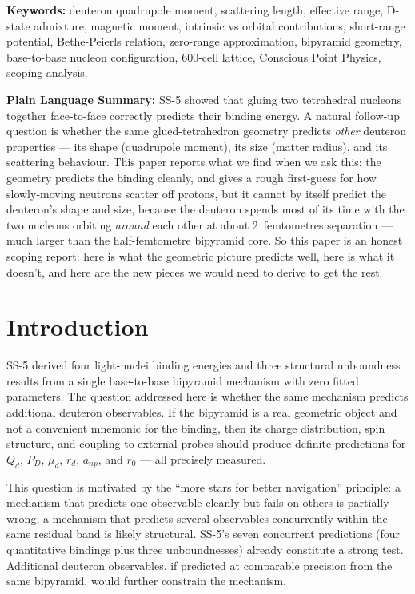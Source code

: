 \documentclass[11pt,letterpaper]{article}
\newcommand{\Qd}{Q_{d}}
\newcommand{\PD}{P_{D}}
\newcommand{\mud}{\mu_{d}}
\newcommand{\anp}{a_{np}}
\newcommand{\rzero}{r_{0}}
\begin{document}
\medskip\noindent
\textbf{Keywords:} deuteron quadrupole moment, scattering length, effective range, D-state admixture, magnetic moment, intrinsic vs orbital contributions, short-range potential, Bethe-Peierls relation, zero-range approximation, bipyramid geometry, base-to-base nucleon configuration, 600-cell lattice, Conscious Point Physics, scoping analysis.

\bigskip\noindent
\textbf{Plain Language Summary:}
SS-5 showed that gluing two tetrahedral nucleons together face-to-face correctly predicts their binding energy. A natural follow-up question is whether the same glued-tetrahedron geometry predicts \emph{other} deuteron properties --- its shape (quadrupole moment), its size (matter radius), and its scattering behaviour. This paper reports what we find when we ask this: the geometry predicts the binding cleanly, and gives a rough first-guess for how slowly-moving neutrons scatter off protons, but it cannot by itself predict the deuteron's shape and size, because the deuteron spends most of its time with the two nucleons orbiting \emph{around} each other at about 2~femtometres separation --- much larger than the half-femtometre bipyramid core. So this paper is an honest scoping report: here is what the geometric picture predicts well, here is what it doesn't, and here are the new pieces we would need to derive to get the rest.

\bigskip
\raggedright
\tableofcontents
\newpage

\section{Introduction}
\label{sec:intro}

SS-5 \cite{abshier2026ss5} derived four light-nuclei binding energies and three structural unboundness results from a single base-to-base bipyramid mechanism with zero fitted parameters. The question addressed here is whether the same mechanism predicts additional deuteron observables. If the bipyramid is a real geometric object and not a convenient mnemonic for the binding, then its charge distribution, spin structure, and coupling to external probes should produce definite predictions for $\Qd$, $\PD$, $\mud$, $r_d$, $\anp$, and $\rzero$ --- all precisely measured.

This question is motivated by the ``more stars for better navigation'' principle: a mechanism that predicts one observable cleanly but fails on others is partially wrong; a mechanism that predicts several observables concurrently within the same residual band is likely structural. SS-5's seven concurrent predictions (four quantitative bindings plus three unboundnesses) already constitute a strong test. Additional deuteron observables, if predicted at comparable precision from the same bipyramid, would further constrain the mechanism.
\end{document}
